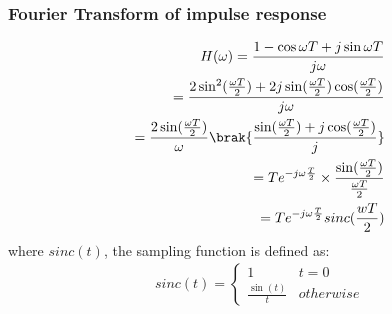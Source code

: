 \documentclass{beamer}
\begin{document}
\begin{frame}
    \frametitle{Fourier Transform of impulse response}
    \begin{flushleft}
    \begin{align}
    H(\omega) = \frac{1-\cos{\omega T} + j\sin{\omega T}}{j \omega}\\
       = \frac{2\sin^2(\frac{\omega T}{2}) + 2j\sin(\frac{\omega T}{2})\cos(\frac{\omega T}{2})}{j\omega}\\
        = \frac{2\sin(\frac{\omega T}{2})}{\omega} \brak{\frac{\sin(\frac{\omega T}{2}) + j\cos(\frac{\omega T}{2})}{j}}\\
         = T e^{-j \omega \frac{T}{2}}\times \frac{\sin(\frac{\omega T}{2})}{\frac{\omega T}{2}} \\
          = T e^{-j\omega\frac{T}{2}} sinc(\frac{wT}{2})
\end{align}
where $sinc(t)$, the sampling function is defined as:
\begin{align}
    sinc(t) = 
    \begin{cases}
    1 & t = 0\\
    \frac{\sin(t)}{t} & otherwise
    \end{cases}
\end{align}
    \end{flushleft}
\end{frame}
\end{document}
